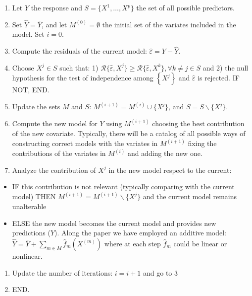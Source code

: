 \documentclass[
]{book}
\begin{document}
\begin{enumerate}
\def\labelenumi{\arabic{enumi}.}
\item
  Let \(Y\) the response and \(S=\{X^1,\ldots,X^p\}\) the set of all possible predictors.
\item
  Set \(\hat{Y}=\bar{Y}\), and let \(M^{(0)}=\emptyset\) the initial set of the variates included in the model. Set \(i=0\).
\item
  Compute the residuals of the current model: \(\hat{\varepsilon}=Y-\hat{Y}\).
\item
  Choose \(X^j\in S\) such that: 1) \(\mathcal{R}\{\hat{\varepsilon},X^j\}\ge \mathcal{R}\{\hat{\varepsilon},X^k\}, \forall k\ne j\in S\) and 2) the null hypothesis for the test of independence among \(\left\{X^j\right\}\) and \(\hat{\varepsilon}\) is rejected. IF NOT, END.
\item
  Update the sets \(M\) and \(S\): \(M^{(i+1)}=M^{(i)}\cup\{X^j\}\), and \(S=S\backslash\{X^j\}\).
\item
  Compute the new model for \(Y\) using \(M^{(i+1)}\) choosing the best contribution of the new covariate. Typically, there will be a catalog of all possible ways of constructing correct models with the variates in \(M^{(i+1)}\) fixing the contributions of the variates in \(M^{(i)}\) and adding the new one.
\item
  Analyze the contribution of \(X^j\) in the new model respect to the current:
\end{enumerate}

\begin{itemize}
\item
  IF this contribution is not relevant (typically comparing with the current model)
  THEN \(M^{(i+1)}=M^{(i+1)}\backslash\{X^j\}\) and the current model remains unalterable
\item
  ELSE the new model becomes the current model and provides new predictions (\(\hat{Y}\)). Along the paper we have employed an additive model: \(\hat{Y}=\bar{Y}+\sum_{m\in M}\hat{f}_m\left(X^{(m)}\right)\) where at each step \(\hat{f}_m\) could be linear or nonlinear.
\end{itemize}

\begin{enumerate}
\def\labelenumi{\arabic{enumi}.}
\setcounter{enumi}{7}
\item
  Update the number of iterations: \(i=i+1\) and go to 3
\item
  END.
\end{enumerate}
\end{document}
